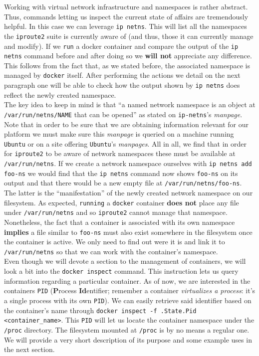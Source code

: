                 Working with virtual network infrastructure and namespaces is rather abstract. Thus, commands letting us inspect the current state of affairs are tremendously helpful. In this case we can leverage \texttt{ip netns}. This will list all the namespaces the \texttt{iproute2} suite is currently aware of (and thus, those it can currently manage and modify). If we \texttt{run} a docker container and compare the output of the \texttt{ip netns} command before and after doing so we \textbf{will not} appreciate any difference. This follows from the fact that, as we stated before, the associated namespace is managed by \texttt{docker} itself. After performing the actions we detail on the next paragraph one will be able to check how the output shown by \texttt{ip netns} does reflect the newly created namespace.\\

                The key idea to keep in mind is that ``a named network namespace is an object at \texttt{/var/run/netns/NAME} that can be opened'' as stated on \texttt{ip-netns}'s \textit{manpage}. Note that in order to be sure that we are obtaining information relevant for our platform we must make sure this \textit{manpage} is queried on a machine running \texttt{Ubuntu} or on a site offering \texttt{Ubuntu}'s \textit{manpages}. All in all, we find that in order for \texttt{iproute2} to be aware of network namespaces these must be available at \texttt{/var/run/netns}. If we create a network namespace ourselves with \texttt{ip netns add foo-ns} we would find that the \texttt{ip netns} command now shows \texttt{foo-ns} on its output and that there would be a new empty file at \texttt{/var/run/netns/foo-ns}. The latter is the ``manifestation'' of the newly created network namespace on our filesystem. As expected, \texttt{running} a \texttt{docker} container \textbf{does not} place any file under \texttt{/var/run/netns} and so \texttt{iproute2} cannot manage that namespace. Nonetheless, the fact that a container is associated with its own namespace \textbf{implies} a file similar to \texttt{foo-ns} must also exist somewhere in the filesystem once the container is active. We only need to find out were it is and link it to \texttt{/var/run/netns} so that we can work with the container's namespace.\\

                Even though we will devote a section to the management of containers, we will look a bit into the \texttt{docker inspect} command. This instruction lets us query information regarding a particular container. As of now, we are interested in the containers \texttt{PID} (\textbf{P}rocess \textbf{Id}entifier; remember a container \textit{virtualizes a process}: it's a single process with its own \texttt{PID}). We can easily retrieve said identifier based on the container's name through \texttt{docker inspect -f {{.State.Pid}} <container\_name>}. This \texttt{PID} will let us locate the container namespace under the \texttt{/proc} directory. The filesystem mounted at \texttt{/proc} is by no means a regular one. We will provide a very short description of its purpose and some example uses in the next section.\\

